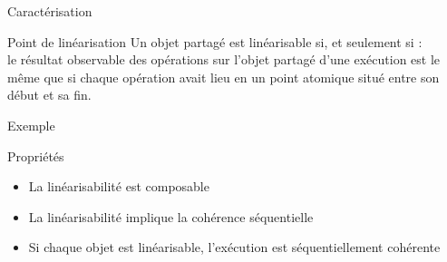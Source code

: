 \begin{frame}{Caractérisation}

  \begin{block}{Point de linéarisation}
    Un objet partagé est linéarisable si, et seulement si : \\
    le résultat observable des opérations sur l'objet partagé d'une exécution est le même que si
    \alert{chaque opération avait lieu en un point atomique
    situé entre son début et sa fin.}
  \end{block}

  \vfill
  \begin{exampleblock}{Exemple}

\begin{center}
    \end{center}
  \end{exampleblock}

\vfill
\small
  \begin{alertblock}{Propriétés}
  \vspace{-2mm}
    \begin{itemize}
      \item La linéarisabilité est composable
      \item La linéarisabilité implique la cohérence séquentielle
      \item Si chaque objet est linéarisable, l'exécution est séquentiellement cohérente
    \end{itemize}
  \end{alertblock}
\end{frame}

